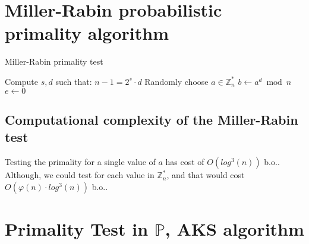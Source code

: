 \section{Miller-Rabin probabilistic primality algorithm}
\begin{algorithm}
\caption{Miller-Rabin primality test}\label{alg:miller_rabin_ptest}
Compute $s, d$ such that: $n - 1 = 2^{s} \cdot d$\;
Randomly choose $a \in \mathbb{Z}_{n}^{*}$\;
$b \gets a^{d} \bmod n$\;
$e \gets 0$\;
\;
\end{algorithm}
\subsection{Computational complexity of the Miller-Rabin test}
Testing the primality for a single value of $a$ has cost of $O(log^{3}(n))$ b.o.. Although, we could test for each value in $\mathbb{Z}_{n}^{*}$, and that would cost $O(\varphi(n) \cdot log^{3}(n))$ b.o..

\section{Primality Test in $\mathbb{P}$, AKS algorithm}
